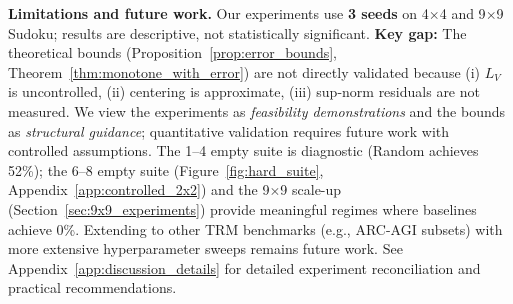 \documentclass{article}
\theoremstyle{plain}
\theoremstyle{definition}
\theoremstyle{remark}
\begin{document}
{\textbf{Limitations and future work.}
Our experiments use \textbf{3 seeds} on 4$\times$4 and 9$\times$9 Sudoku; results are descriptive, not statistically significant.
\textbf{Key gap:} The theoretical bounds (Proposition~\ref{prop:error_bounds}, Theorem~\ref{thm:monotone_with_error}) are not directly validated because (i) $L_V$ is uncontrolled, (ii) centering is approximate, (iii) sup-norm residuals are not measured.
We view the experiments as \emph{feasibility demonstrations} and the bounds as \emph{structural guidance}; quantitative validation requires future work with controlled assumptions.
The 1--4 empty suite is diagnostic (Random achieves 52\%); the 6--8 empty suite (Figure~\ref{fig:hard_suite}, Appendix~\ref{app:controlled_2x2}) and the 9$\times$9 scale-up (Section~\ref{sec:9x9_experiments}) provide meaningful regimes where baselines achieve 0\%.
Extending to other TRM benchmarks (e.g., ARC-AGI subsets) with more extensive hyperparameter sweeps remains future work.
See Appendix~\ref{app:discussion_details} for detailed experiment reconciliation and practical recommendations.
}
\end{document}
